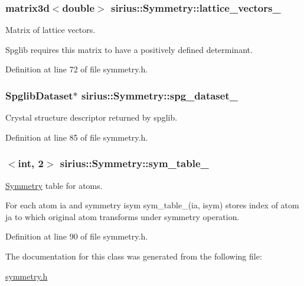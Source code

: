 \subsubsection[{lattice\+\_\+vectors\+\_\+}]{\setlength{\rightskip}{0pt plus 5cm}matrix3d$<$double$>$ sirius\+::\+Symmetry\+::lattice\+\_\+vectors\+\_\+\hspace{0.3cm}{\ttfamily [private]}}\label{classsirius_1_1_symmetry_a1c35a9b0ec45df680af1758a2a7a774f}


Matrix of lattice vectors. 

Spglib requires this matrix to have a positively defined determinant. 

Definition at line 72 of file symmetry.\+h.

\hypertarget{classsirius_1_1_symmetry_abd01ed209aa1e2a1e3af374c63979e1f}{}
\subsubsection[{spg\+\_\+dataset\+\_\+}]{\setlength{\rightskip}{0pt plus 5cm}Spglib\+Dataset$\ast$ sirius\+::\+Symmetry\+::spg\+\_\+dataset\+\_\+\hspace{0.3cm}{\ttfamily [private]}}\label{classsirius_1_1_symmetry_abd01ed209aa1e2a1e3af374c63979e1f}


Crystal structure descriptor returned by spglib. 



Definition at line 85 of file symmetry.\+h.

\hypertarget{classsirius_1_1_symmetry_a3d0703b85bf7c675f5129a6a9ef76084}{}
\subsubsection[{sym\+\_\+table\+\_\+}]{$<$int, 2$>$ sirius\+::\+Symmetry\+::sym\+\_\+table\+\_\+\hspace{0.3cm}{\ttfamily [private]}}\label{classsirius_1_1_symmetry_a3d0703b85bf7c675f5129a6a9ef76084}


\hyperlink{classsirius_1_1_symmetry}{Symmetry} table for atoms. 

For each atom ia and symmetry isym sym\+\_\+table\+\_\+(ia, isym) stores index of atom ja to which original atom transforms under symmetry operation. 

Definition at line 90 of file symmetry.\+h.



The documentation for this class was generated from the following file\+:\begin{DoxyCompactItemize}
\item 
\hyperlink{symmetry_8h}{symmetry.\+h}\end{DoxyCompactItemize}
